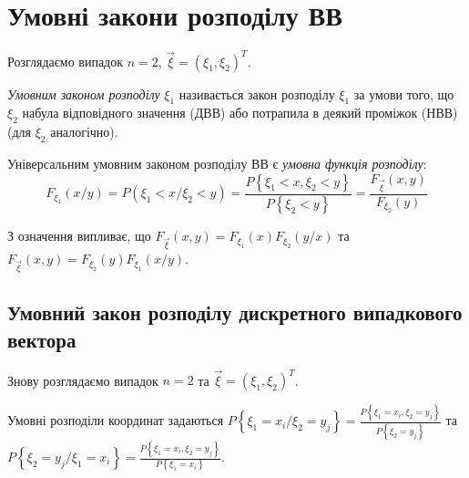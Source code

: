 
\section{Умовні закони розподілу ВВ}

Розглядаємо випадок $n = 2$, $\vec{\xi} = \left(\xi_1, \xi_2\right)^T$.

\begin{definition}
    \emph{Умовним законом розподілу} $\xi_1$ називається закон розподілу 
    $\xi_1$ за умови того, що $\xi_2$ набула відповідного значення (ДВВ) 
    або потрапила в деякий проміжок (НВВ) (для $\xi_2$ аналогічно).
\end{definition}

\begin{definition}
    Універсальним умовним законом розподілу ВВ є \emph{умовна функція 
    розподілу}:
    \begin{equation*}
        F_{\xi_1}(x/y) = P({\xi_1 < x}/{\xi_2 < y}) = 
        \frac{P\left\{\xi_1 < x, \xi_2 < y\right\}}
        {P\left\{\xi_2 < y\right\}} = 
        \frac{F_{\vec{\xi}}(x, y)}{F_{\xi_2}(y)}
    \end{equation*}
\end{definition}
\begin{remark}
    З означення випливає, що 
    $F_{\vec{\xi}}(x,y) = F_{\xi_1}(x)F_{\xi_2}(y/x)$
    та 
    $F_{\vec{\xi}}(x,y) = F_{\xi_2}(y)F_{\xi_1}(x/y)$.
\end{remark}
\subsection{Умовний закон розподілу дискретного випадкового вектора}
Знову розглядаємо випадок $n=2$ та $\vec{\xi} = (\xi_1, \xi_2)^T$.

Умовні розподіли координат задаються $P\left\{\xi_1 = x_i / \xi_2 = y_j\right\} = 
\frac{P\left\{\xi_1 = x_i , \xi_2 = y_j\right\}}
{P\left\{\xi_2 = y_j\right\}}$ та \\ 
$P\left\{\xi_2 = y_j / \xi_1 = x_i\right\} = 
\frac{P\left\{\xi_1 = x_i , \xi_2 = y_j\right\}}
{P\left\{\xi_1 = x_i\right\}}$.

